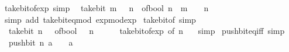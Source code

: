\begin{isabellebody}
\isanewline
\isanewline
{}\isamarkupfalse%
\ take{\isacharunderscore}{\kern0pt}bit{\isacharunderscore}{\kern0pt}of{\isacharunderscore}{\kern0pt}exp\ {\isacharbrackleft}{\kern0pt}simp{\isacharbrackright}{\kern0pt}{\isacharcolon}{\kern0pt}\isanewline
\ \ {\isacartoucheopen}take{\isacharunderscore}{\kern0pt}bit\ m\ {\isacharparenleft}{\kern0pt}{}\ {\isacharcircum}{\kern0pt}\ n{\isacharparenright}{\kern0pt}\ {\isacharequal}{\kern0pt}\ of{\isacharunderscore}{\kern0pt}bool\ {\isacharparenleft}{\kern0pt}n\ {\isacharless}{\kern0pt}\ m{\isacharparenright}{\kern0pt}\ {\isacharasterisk}{\kern0pt}\ {}\ {\isacharcircum}{\kern0pt}\ n{\isacartoucheclose}\isanewline
%
\isadelimproof
\ \ %
\endisadelimproof
%
\isatagproof
{}\isamarkupfalse%
\ {\isacharparenleft}{\kern0pt}simp\ add{\isacharcolon}{\kern0pt}\ take{\isacharunderscore}{\kern0pt}bit{\isacharunderscore}{\kern0pt}eq{\isacharunderscore}{\kern0pt}mod\ exp{\isacharunderscore}{\kern0pt}mod{\isacharunderscore}{\kern0pt}exp{\isacharparenright}{\kern0pt}%
\endisatagproof
{\isafoldproof}%
%
\isadelimproof
\isanewline
%
\endisadelimproof
\isanewline
{}\isamarkupfalse%
\ take{\isacharunderscore}{\kern0pt}bit{\isacharunderscore}{\kern0pt}of{\isacharunderscore}{\kern0pt}{}\ {\isacharbrackleft}{\kern0pt}simp{\isacharbrackright}{\kern0pt}{\isacharcolon}{\kern0pt}\isanewline
\ \ {\isacartoucheopen}take{\isacharunderscore}{\kern0pt}bit\ n\ {}\ {\isacharequal}{\kern0pt}\ of{\isacharunderscore}{\kern0pt}bool\ {\isacharparenleft}{\kern0pt}{}\ {\isasymle}\ n{\isacharparenright}{\kern0pt}\ {\isacharasterisk}{\kern0pt}\ {}{\isacartoucheclose}\isanewline
%
\isadelimproof
\ \ %
\endisadelimproof
%
\isatagproof
{}\isamarkupfalse%
\ take{\isacharunderscore}{\kern0pt}bit{\isacharunderscore}{\kern0pt}of{\isacharunderscore}{\kern0pt}exp\ {\isacharbrackleft}{\kern0pt}of\ n\ {}{\isacharbrackright}{\kern0pt}\ \isamarkupfalse%
\ simp%
\endisatagproof
{\isafoldproof}%
%
\isadelimproof
\isanewline
%
\endisadelimproof
\isanewline
{}\isamarkupfalse%
\ push{\isacharunderscore}{\kern0pt}bit{\isacharunderscore}{\kern0pt}eq{\isacharunderscore}{\kern0pt}{}{\isacharunderscore}{\kern0pt}iff\ {\isacharbrackleft}{\kern0pt}simp{\isacharbrackright}{\kern0pt}{\isacharcolon}{\kern0pt}\isanewline
\ \ {\isachardoublequoteopen}push{\isacharunderscore}{\kern0pt}bit\ n\ a\ {\isacharequal}{\kern0pt}\ {}\ {\isasymlongleftrightarrow}\ a\ {\isacharequal}{\kern0pt}\ {}{\isachardoublequoteclose}\isanewline

\end{isabellebody}

